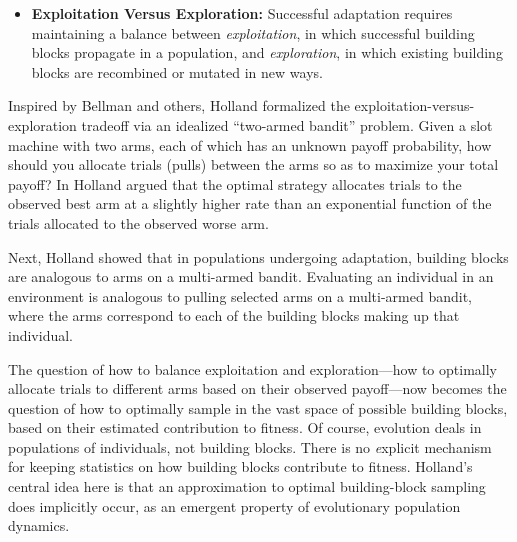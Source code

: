 \documentclass{sig-alternate}
\begin{document}
\begin{itemize}

\item{\bf Exploitation Versus Exploration:} Successful adaptation
  requires maintaining a balance between \emph{exploitation}, in which
  successful building blocks propagate in a population, and
  \emph{exploration}, in which existing building blocks are recombined
  or mutated in new ways.

\end{itemize} 

Inspired by Bellman \cite{Bellman1961} and
others, Holland formalized the exploitation-versus-exploration tradeoff
via an idealized ``two-armed bandit'' problem. Given a slot machine
with two arms, each of which has an unknown payoff probability, how
should you allocate trials (pulls) between the arms so as to
maximize your total payoff?   In \cite{Holland1973,Holland1975}
Holland argued that the optimal strategy
allocates trials to the observed best arm at a slightly higher rate than
an exponential function of the trials allocated to the observed worse arm.  

Next, Holland showed that in populations undergoing adaptation,
building blocks are analogous to arms on a multi-armed bandit.  
Evaluating an individual in an environment is analogous to pulling selected
arms on a multi-armed bandit, where the arms correspond to each of the
building blocks making up that individual.

The question of how to balance exploitation and exploration---how to
optimally allocate trials to different arms based on their observed 
payoff---now becomes the question of how to optimally sample in the
vast space of possible building blocks, based on their estimated
contribution to fitness.  Of course, evolution deals in populations of
individuals, not building blocks.  There is no {\emph explicit} mechanism for
keeping statistics on how building blocks contribute to fitness. 
Holland's central idea here is that an approximation to
optimal building-block sampling does implicitly occur, as an emergent
property of evolutionary population dynamics.
\end{document}
